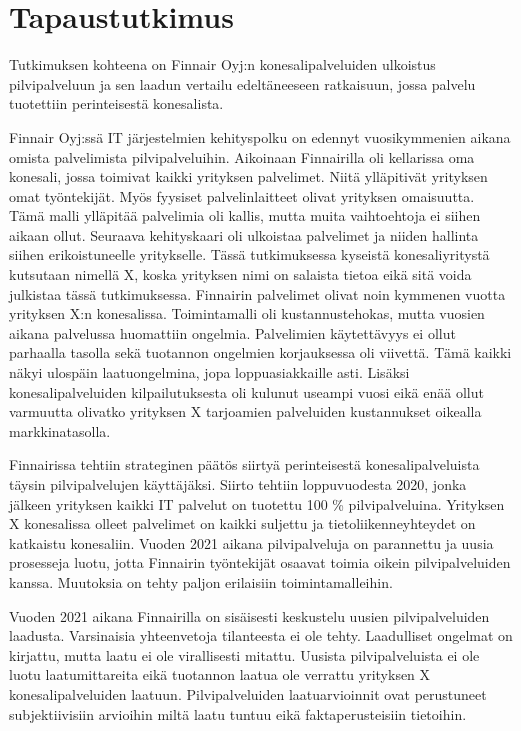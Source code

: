 \chapter{Tapaustutkimus\label{tapautustutkimus}}
Tutkimuksen kohteena on Finnair Oyj:n konesalipalveluiden ulkoistus pilvipalveluun ja sen laadun vertailu edeltäneeseen ratkaisuun, jossa palvelu tuotettiin perinteisestä konesalista.

Finnair Oyj:ssä IT järjestelmien kehityspolku on edennyt vuosikymmenien aikana omista palvelimista pilvipalveluihin. Aikoinaan Finnairilla oli kellarissa oma konesali, jossa toimivat kaikki yrityksen palvelimet. Niitä ylläpitivät yrityksen omat työntekijät. Myös fyysiset palvelinlaitteet olivat yrityksen omaisuutta. Tämä malli ylläpitää palvelimia oli kallis, mutta muita vaihtoehtoja ei siihen aikaan ollut. Seuraava kehityskaari oli ulkoistaa palvelimet ja niiden hallinta siihen erikoistuneelle yritykselle. Tässä tutkimuksessa kyseistä konesaliyritystä kutsutaan nimellä X, koska yrityksen nimi on salaista tietoa eikä sitä voida julkistaa tässä tutkimuksessa. Finnairin palvelimet olivat noin kymmenen vuotta yrityksen X:n konesalissa. Toimintamalli oli kustannustehokas, mutta vuosien aikana palvelussa huomattiin ongelmia. Palvelimien käytettävyys ei ollut parhaalla tasolla sekä tuotannon ongelmien korjauksessa oli viivettä. Tämä kaikki näkyi ulospäin laatuongelmina, jopa loppuasiakkaille asti. Lisäksi konesalipalveluiden kilpailutuksesta oli kulunut useampi vuosi eikä enää ollut varmuutta olivatko yrityksen X tarjoamien palveluiden kustannukset oikealla markkinatasolla.

Finnairissa tehtiin strateginen päätös siirtyä perinteisestä konesalipalveluista täysin pilvipalvelujen käyttäjäksi. Siirto tehtiin loppuvuodesta 2020, jonka jälkeen yrityksen kaikki IT palvelut on tuotettu 100 \% pilvipalveluina. Yrityksen X konesalissa olleet palvelimet on kaikki suljettu ja tietoliikenneyhteydet on katkaistu konesaliin. Vuoden 2021 aikana pilvipalveluja on parannettu ja uusia prosesseja luotu, jotta Finnairin työntekijät osaavat toimia oikein pilvipalveluiden kanssa. Muutoksia on tehty paljon erilaisiin toimintamalleihin.

Vuoden 2021 aikana Finnairilla on sisäisesti keskustelu uusien pilvipalveluiden laadusta. Varsinaisia yhteenvetoja tilanteesta ei ole tehty. Laadulliset ongelmat on kirjattu, mutta laatu ei ole virallisesti mitattu. Uusista pilvipalveluista ei ole luotu laatumittareita eikä tuotannon laatua ole verrattu yrityksen X konesalipalveluiden laatuun. Pilvipalveluiden laatuarvioinnit ovat perustuneet subjektiivisiin arvioihin miltä laatu tuntuu eikä faktaperusteisiin tietoihin. 
